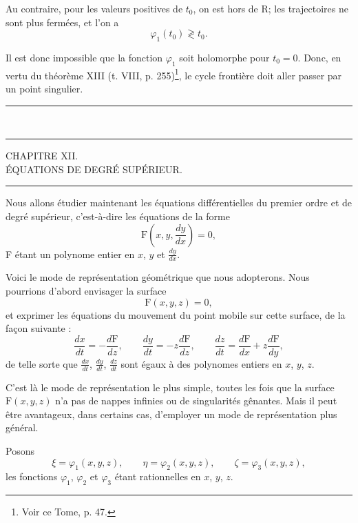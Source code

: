 \documentclass[11pt]{article}
\newcommand{\ornament}{\begin{center}\rule{2.5em}{0.4pt}\,\raisebox{0.1ex}{\tiny$\bullet\bullet\bullet$}\,\rule{2.5em}{0.4pt}\end{center}}
\newcommand{\shortline}{\begin{center}\rule{3.5em}{0.4pt}\end{center}}
\begin{document}
Au contraire, pour les valeurs positives de $t_0$, on est hors de R; les trajectoires ne sont plus fermées, et l’on a
\[
\varphi_1(t_0)\gtrless t_0.
\]

Il est donc impossible que la fonction $\varphi_1$ soit holomorphe pour $t_0=0$. Donc, en vertu du théorème XIII (t. VIII, p. 255)\footnote{Voir ce Tome, p. 47.}, le cycle frontière doit aller passer par un point singulier.

\ornament

\begin{center}
{\large CHAPITRE XII.}\\[0.4em]
{\small ÉQUATIONS DE DEGRÉ SUPÉRIEUR.}
\end{center}
\shortline

Nous allons étudier maintenant les équations différentielles du premier ordre et de degré supérieur, c’est-à-dire les équations de la forme
\begin{equation}\tag{1}
\mathrm{F}\left(x,y,\frac{dy}{dx}\right)=0,
\end{equation}
F étant un polynome entier en $x$, $y$ et $\frac{dy}{dx}$.

Voici le mode de représentation géométrique que nous adopterons. Nous pourrions d’abord envisager la surface
\begin{equation}\tag{2}
\mathrm{F}(x,y,z)=0,
\end{equation}
et exprimer les équations du mouvement du point mobile sur cette surface, de la façon suivante :
\begin{equation}\tag{2 bis}
\frac{dx}{dt}=-\frac{d\mathrm{F}}{dz},\qquad
\frac{dy}{dt}=-z\frac{d\mathrm{F}}{dz},\qquad
\frac{dz}{dt}=\frac{d\mathrm{F}}{dx}+z\frac{d\mathrm{F}}{dy},
\end{equation}
de telle sorte que $\frac{dx}{dt}$, $\frac{dy}{dt}$, $\frac{dz}{dt}$ sont égaux à des polynomes entiers en $x$, $y$, $z$.

C’est là le mode de représentation le plus simple, toutes les fois que la surface $\mathrm{F}(x,y,z)$ n’a pas de nappes infinies ou de singularités gênantes. Mais il peut être avantageux, dans certains cas, d’employer un mode de représentation plus général.

Posons
\begin{equation}\tag{3}
\xi=\varphi_1(x,y,z),\qquad
\eta=\varphi_2(x,y,z),\qquad
\zeta=\varphi_3(x,y,z),
\end{equation}
les fonctions $\varphi_1$, $\varphi_2$ et $\varphi_3$ étant rationnelles en $x$, $y$, $z$.
\end{document}

